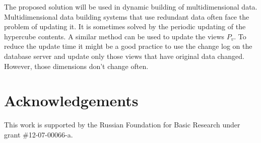 \documentclass[preprint,12pt]{elsarticle}
\begin{document}
The proposed solution will be used in dynamic building of multidimensional data.
Multidimensional data building systems that use redundant data often face the
problem of updating it. It is sometimes solved by the periodic updating of the
hypercube contents.
A similar method can be used to update the views $P_v$. To reduce the update
time it might be a good practice to use the change log on the database server
and update only those views that have original data changed. However, those
dimensions don't change often.

\section{Acknowledgements}
This work is supported by the Russian Foundation for Basic Research under
grant \#12-07-00066-a.



\end{document}
